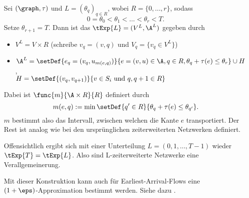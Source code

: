 \begin{definition}
    Sei $(\graph, \tau)$ und $L = (\theta_q)_{q \in R}$, wobei $R = \{0, \ldots, r\}$,
    sodass
    \[
        0 = \theta_0 < \theta_1 < \ldots < \theta_r < T.
    \]
    Setze $\theta_{r+1} = T$.
    Dann ist das  $\tExp{L} = (V^L, \A^L)$
    gegeben durch
    \begin{itemize}
        \item $V^L = V \times R$ (schreibe $v_q = (v, q)$ und
            $V_q = \{v_q \in V^L\}$)
        \item $\A^L = \setDef{e_q = (v_q, u_{m(e, q)})}
                        {e = (v, u) \in \A, q \in R, \theta_q + \tau(e) \leq \theta_r}
                    \cup H$, \\
             $H = \setDef{(v_q, v_{q+1})}
                                    {v \in S_i \text{ und } q, q+1 \in R}$
    \end{itemize}

    Dabei ist $\func{m}{\A \times R}{R}$ definiert durch
    \[
        m(e, q) := \min \setDef{q' \in R}{\theta_q + \tau(e) \leq \theta_{q'}}.
    \]
    $m$ bestimmt also das Intervall, zwischen welchen die Kante $e$ transportiert.
    Der Rest ist analog wie bei den ursprünglichen zeiterweiterten Netzwerken
    definiert.
\end{definition}

\begin{remark}
    Offensichtlich ergibt sich mit einer Unterteilung $L = (0, 1, \ldots, T-1)$
    wieder $\tExp{T} = \tExp{L}$. Also sind L-zeiterweiterte Netzwerke
    eine Verallgemeinerung.
\end{remark}

Mit dieser Konstruktion kann auch für Earliest-Arrival-Flows eine \\
$(1+\eps)$-Approximation bestimmt werden. Siehe dazu \cite[5.2]{fleischerSiam}.
